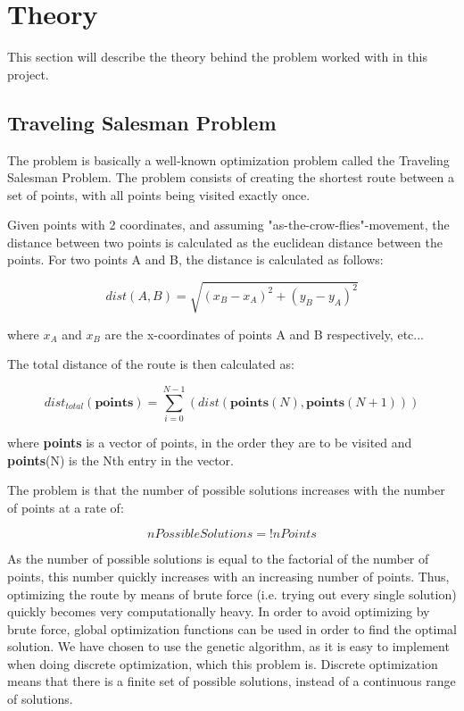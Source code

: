 
\chapter{Theory}
This section will describe the theory behind the problem worked with in this project.

\section{Traveling Salesman Problem}
The problem is basically a well-known optimization problem called the Traveling Salesman Problem\cite{wiki:TSP}. The problem consists of creating the shortest route between a set of points, with all points being visited exactly once. 

Given points with 2 coordinates, and assuming "as-the-crow-flies"-movement, the distance between two points is calculated as the euclidean distance between the points. For two points A and B, the distance is calculated as follows:

\begin{equation}
	dist(A,B) = \sqrt{(x_B - x_A)^2 + (y_B - y_A)^2}
\end{equation}

where $x_A$ and $x_B$ are the x-coordinates of points A and B respectively, etc...

The total distance of the route is then calculated as:

\begin{equation}
	dist_{total}(\textbf{points}) = \sum_{i=0}^{N-1}(dist(\textbf{points}(N),\textbf{points}(N+1)))
\end{equation}

where \textbf{points} is a vector of points, in the order they are to be visited and \textbf{points}(N) is the Nth entry in the vector.

The problem is that the number of possible solutions increases with the number of points at a rate of:

\begin{equation}
	nPossibleSolutions=!nPoints
\end{equation}

\label{eq:number_of_possible_solutions}
As the number of possible solutions is equal to the factorial of the number of points, this number quickly increases with an increasing number of points. Thus, optimizing the route by means of brute force (i.e. trying out every single solution) quickly becomes very computationally heavy. In order to avoid optimizing by brute force, global optimization functions can be used in order to find the optimal solution. We have chosen to use the genetic algorithm, as it is easy to implement when doing discrete optimization, which this problem is. Discrete optimization means that there is a finite set of possible solutions, instead of a continuous range of solutions.

